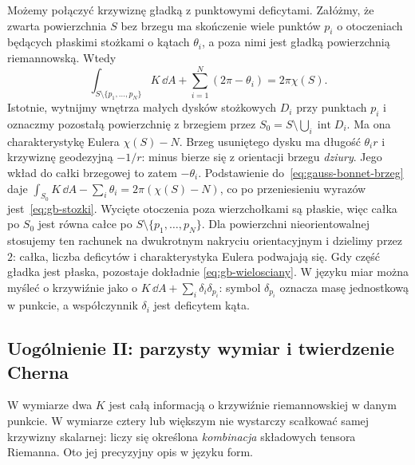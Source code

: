 Możemy połączyć krzywiznę gładką z punktowymi deficytami.
Załóżmy, że zwarta powierzchnia $S$ bez brzegu ma skończenie wiele
punktów $p_i$ o otoczeniach będących płaskimi stożkami
o kątach $\theta_i$, a poza nimi jest gładką powierzchnią
riemannowską. Wtedy
\begin{equation}\label{eq:gb-stozki}
 \boxed{\displaystyle
 \int_{S\setminus\{p_1,\ldots,p_N\}}K\,\dd A
       +\sum_{i=1}^N(2\pi-\theta_i)
       =2\pi\chi(S).}
\end{equation}
Istotnie, wytnijmy wnętrza małych dysków stożkowych $D_i$
przy punktach $p_i$ i oznaczmy pozostałą powierzchnię z brzegiem
przez $S_0=S\setminus\bigcup_i\operatorname{int}D_i$.
Ma ona charakterystykę Eulera $\chi(S)-N$.
Brzeg usuniętego dysku ma długość
$\theta_i r$ i krzywiznę geodezyjną $-1/r$:
minus bierze się z orientacji brzegu \emph{dziury}.
Jego wkład do całki brzegowej to zatem $-\theta_i$.
Podstawienie do~\eqref{eq:gauss-bonnet-brzeg} daje
$\int_{S_0} K\,\dd A-\sum_i\theta_i=2\pi(\chi(S)-N)$,
co po przeniesieniu wyrazów jest~\eqref{eq:gb-stozki}.
Wycięte otoczenia poza wierzchołkami są płaskie,
więc całka po $S_0$ jest równa całce po
$S\setminus\{p_1,\ldots,p_N\}$.
Dla powierzchni nieorientowalnej stosujemy ten rachunek
na dwukrotnym nakryciu orientacyjnym i dzielimy przez $2$:
całka, liczba deficytów i charakterystyka Eulera podwajają się.
Gdy część gładka jest płaska, pozostaje dokładnie
\eqref{eq:gb-wielosciany}. W języku miar można myśleć
o krzywiźnie jako o $K\,\dd A+\sum_i\delta_i\delta_{p_i}$:
symbol $\delta_{p_i}$ oznacza masę jednostkową w punkcie,
a współczynnik $\delta_i$ jest deficytem kąta.

\subsection*{Uogólnienie II: parzysty wymiar i twierdzenie Cherna}

W wymiarze dwa $K$ jest całą informacją o krzywiźnie
riemannowskiej w danym punkcie. W wymiarze cztery lub
większym nie wystarczy scałkować samej krzywizny skalarnej:
liczy się określona \emph{kombinacja} składowych tensora
Riemanna. Oto jej precyzyjny opis w języku form.

